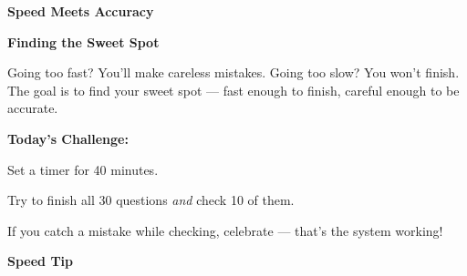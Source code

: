 \clearpage
\thispagestyle{empty}
{\sffamily

\begin{center}
{\fontsize{22}{26}\selectfont\bfseries\color{funOrange} \faTachometerAlt\hspace{3mm}Speed Meets Accuracy\hspace{3mm}\faTachometerAlt}

\vspace{2mm}
{\color{funGray}\hrulefill}
\end{center}

\vspace{3mm}

\begin{tcolorbox}[
    enhanced,
    colback=funOrangeLight,
    colframe=funOrange!50,
    arc=10pt,
    boxrule=1.5pt,
    left=6mm, right=6mm, top=5mm, bottom=5mm,
]
{\large\bfseries\color{funOrangeDark} \faBalanceScale\hspace{2mm}Finding the Sweet Spot}

\vspace{2mm}

Going too fast? You'll make careless mistakes. Going too slow? You won't finish. The goal is to find your sweet spot — fast enough to finish, careful enough to be accurate.

\vspace{3mm}

\textbf{Today's Challenge:}

\vspace{2mm}

\textcolor{funOrange}{\faCheckCircle}\hspace{2mm}Set a timer for 40 minutes.

\vspace{2mm}

\textcolor{funOrange}{\faCheckCircle}\hspace{2mm}Try to finish all 30 questions \textit{and} check 10 of them.

\vspace{2mm}

\textcolor{funOrange}{\faCheckCircle}\hspace{2mm}If you catch a mistake while checking, celebrate — that's the system working!
\end{tcolorbox}

\vspace{3mm}

\begin{tcolorbox}[
    enhanced,
    colback=funYellowLight,
    colframe=funYellow!60,
    arc=10pt,
    boxrule=1pt,
    left=6mm, right=6mm, top=4mm, bottom=4mm,
]
{\bfseries\color{funYellowDark} \faLightbulb\hspace{2mm}Speed Tip}


\end{tcolorbox}}
